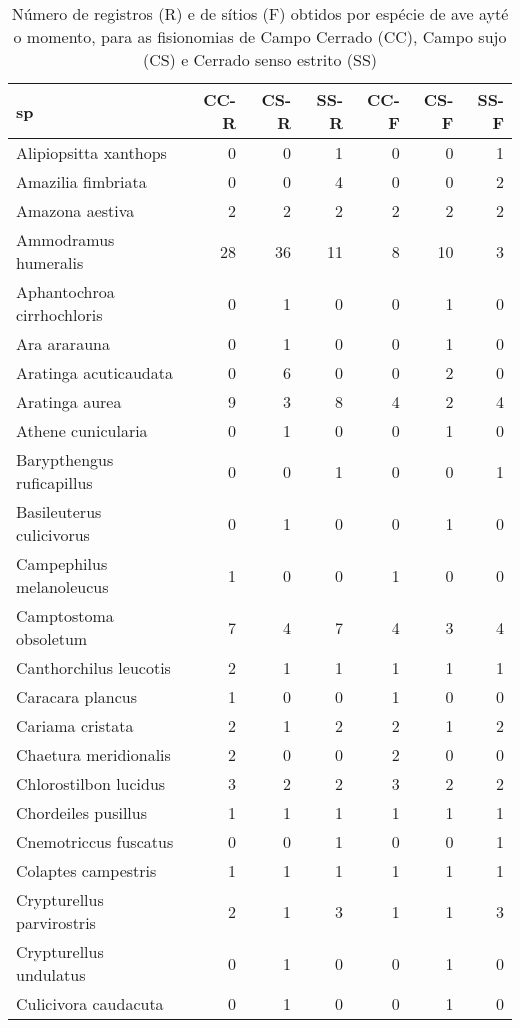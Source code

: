 \begin{table}[ht]
\centering
\label{tab:aves1}
\caption{ Número de registros (R) e de sítios (F) obtidos por espécie de ave
ayté o momento, para as fisionomias de Campo Cerrado (CC), Campo sujo (CS) e Cerrado senso estrito (SS)}
\begin{tabular}{lrrrrrr}
  \hline
  sp & CC-R & CS-R & SS-R &  CC-F & CS-F & SS-F \\
  \hline
  Alipiopsitta xanthops & 0 & 0 & 1 & 0 & 0 & 1 \\ 
  Amazilia fimbriata & 0 & 0 & 4 & 0 & 0 & 2 \\ 
  Amazona aestiva & 2 & 2 & 2 & 2 & 2 & 2 \\ 
  Ammodramus humeralis & 28 & 36 & 11 & 8 & 10 & 3 \\ 
  Aphantochroa cirrhochloris & 0 & 1 & 0 & 0 & 1 & 0 \\ 
  Ara ararauna & 0 & 1 & 0 & 0 & 1 & 0 \\ 
  Aratinga acuticaudata & 0 & 6 & 0 & 0 & 2 & 0 \\ 
  Aratinga aurea & 9 & 3 & 8 & 4 & 2 & 4 \\ 
  Athene cunicularia & 0 & 1 & 0 & 0 & 1 & 0 \\ 
  Barypthengus ruficapillus & 0 & 0 & 1 & 0 & 0 & 1 \\ 
  Basileuterus culicivorus & 0 & 1 & 0 & 0 & 1 & 0 \\ 
  Campephilus melanoleucus & 1 & 0 & 0 & 1 & 0 & 0 \\ 
  Camptostoma obsoletum & 7 & 4 & 7 & 4 & 3 & 4 \\ 
  Canthorchilus leucotis & 2 & 1 & 1 & 1 & 1 & 1 \\ 
  Caracara plancus & 1 & 0 & 0 & 1 & 0 & 0 \\ 
  Cariama cristata & 2 & 1 & 2 & 2 & 1 & 2 \\ 
  Chaetura meridionalis & 2 & 0 & 0 & 2 & 0 & 0 \\ 
  Chlorostilbon lucidus & 3 & 2 & 2 & 3 & 2 & 2 \\ 
  Chordeiles pusillus & 1 & 1 & 1 & 1 & 1 & 1 \\ 
  Cnemotriccus fuscatus & 0 & 0 & 1 & 0 & 0 & 1 \\ 
  Colaptes campestris & 1 & 1 & 1 & 1 & 1 & 1 \\ 
  Crypturellus parvirostris & 2 & 1 & 3 & 1 & 1 & 3 \\ 
  Crypturellus undulatus & 0 & 1 & 0 & 0 & 1 & 0 \\ 
  Culicivora caudacuta & 0 & 1 & 0 & 0 & 1 & 0 \\ 

\end{tabular}
\end{table}
